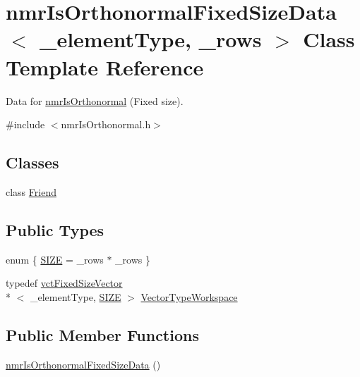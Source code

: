 \hypertarget{classnmr_is_orthonormal_fixed_size_data}{\section{nmr\-Is\-Orthonormal\-Fixed\-Size\-Data$<$ \-\_\-element\-Type, \-\_\-rows $>$ Class Template Reference}
\label{classnmr_is_orthonormal_fixed_size_data}
}


Data for \hyperlink{nmr_is_orthonormal_8h_acf0ff1e2dbe0c988db04d9db1e2e7697}{nmr\-Is\-Orthonormal} (Fixed size).  




{\ttfamily \#include $<$nmr\-Is\-Orthonormal.\-h$>$}

\subsection*{Classes}
\begin{DoxyCompactItemize}
\item 
class \hyperlink{classnmr_is_orthonormal_fixed_size_data_1_1_friend}{Friend}
\end{DoxyCompactItemize}
\subsection*{Public Types}
\begin{DoxyCompactItemize}
\item 
enum \{ \hyperlink{classnmr_is_orthonormal_fixed_size_data_ac9b5f816b0d687bdd50210cbdfe1663caeabb21a3e2e6f96c3895dc03d022f297}{S\-I\-Z\-E} = \-\_\-rows $\ast$ \-\_\-rows
 \}
\item 
typedef \hyperlink{classvct_fixed_size_vector}{vct\-Fixed\-Size\-Vector}\\*
$<$ \-\_\-element\-Type, \hyperlink{classnmr_is_orthonormal_fixed_size_data_ac9b5f816b0d687bdd50210cbdfe1663caeabb21a3e2e6f96c3895dc03d022f297}{S\-I\-Z\-E} $>$ \hyperlink{classnmr_is_orthonormal_fixed_size_data_a9c2423d8da4e6400b83e1425454bbbe3}{Vector\-Type\-Workspace}
\end{DoxyCompactItemize}
\subsection*{Public Member Functions}
\begin{DoxyCompactItemize}
\item 
\hyperlink{classnmr_is_orthonormal_fixed_size_data_aa9468e75b1a0437d067e1bafd9cbee0e}{nmr\-Is\-Orthonormal\-Fixed\-Size\-Data} ()
\end{DoxyCompactItemize}
